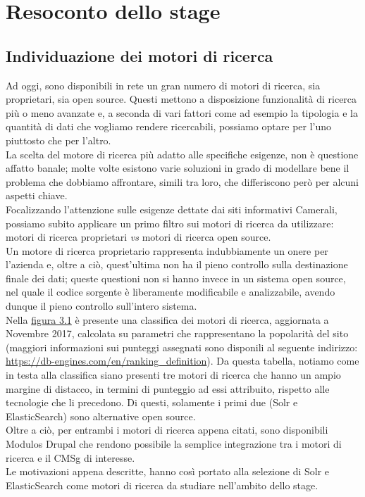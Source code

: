 

\chapter{Resoconto dello stage}
\label{cap:resoconto_dello_stage}

	\section{Individuazione dei motori di ricerca}
	\label{sec:individuazione_dei_motori_di_ricerca}
	Ad oggi, sono disponibili in rete un gran numero di motori di ricerca, sia proprietari, sia \gls{open source}. Questi mettono a disposizione funzionalità di ricerca più o meno avanzate e, a seconda di vari fattori come ad esempio la tipologia e la quantità di dati che vogliamo rendere ricercabili, possiamo optare per l'uno piuttosto che per l'altro. \\
	La scelta del motore di ricerca più adatto alle specifiche esigenze, non è questione affatto banale; molte volte esistono varie soluzioni in grado di modellare bene il problema che dobbiamo affrontare, simili tra loro, che differiscono però per alcuni aspetti chiave. \\
	Focalizzando l'attenzione sulle esigenze dettate dai siti informativi Camerali, possiamo subito applicare un primo filtro sui motori di ricerca da utilizzare: motori di ricerca proprietari \textit{vs} motori di ricerca \gls{open source}. \\
	Un motore di ricerca proprietario rappresenta indubbiamente un onere per l'azienda e, oltre a ciò, quest'ultima non ha il pieno controllo sulla destinazione finale dei dati; queste questioni non si hanno invece in un sistema \gls{open source}, nel quale il codice sorgente è liberamente modificabile e analizzabile, avendo dunque il pieno controllo sull'intero sistema. \\
	Nella \hyperref[img:confronto_SE]{figura 3.1} è presente una classifica dei motori di ricerca, aggiornata a Novembre 2017, calcolata su parametri che rappresentano la popolarità del sito (maggiori informazioni sui punteggi assegnati sono disponili al seguente indirizzo: \url{https://db-engines.com/en/ranking_definition}). Da questa tabella, notiamo come in testa alla classifica siano presenti tre motori di ricerca che hanno un ampio margine di distacco, in termini di punteggio ad essi attribuito, rispetto alle tecnologie che li precedono. Di questi, solamente i primi due (\gls{Solr} e \gls{ElasticSearch}) sono alternative \gls{open source}. \\
	Oltre a ciò, per entrambi i motori di ricerca appena citati, sono disponibili \glspl{Modulo} \gls{Drupal} che rendono possibile la semplice integrazione tra i motori di ricerca e il \gls{CMSg} di interesse. \\
	Le motivazioni appena descritte, hanno così portato alla selezione di \gls{Solr} e \gls{ElasticSearch} come motori di ricerca da studiare nell'ambito dello stage.

